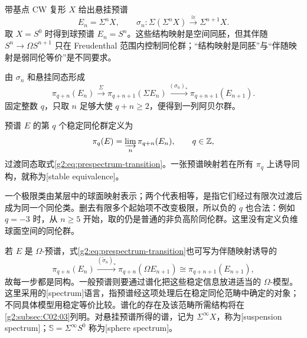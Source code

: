 \begin{example}\label{g2:exm:suspension-prespectrum}
	带基点 CW 复形 \(X\) 给出悬挂预谱
	\[
		E_n=\Sigma^nX,\qquad
		\sigma_n:\Sigma(\Sigma^nX)\xrightarrow{\cong}\Sigma^{n+1}X.
	\]
	取 \(X=S^0\) 时得到球预谱 \(E_n=S^n\)。这些结构映射是空间同胚，但其伴随 \(S^n\to\Omega S^{n+1}\) 只在 Freudenthal 范围内控制同伦群；“结构映射是同胚”与“伴随映射是弱同伦等价”是不同要求。
\end{example}

由 \(\sigma_n\) 和悬挂同态形成
\begin{equation}\label{g2:eq:prespectrum-transition}
	\pi_{q+n}(E_n)\xrightarrow{\ \Sigma\ }
	\pi_{q+n+1}(\Sigma E_n)
	\xrightarrow{(\sigma_n)_*}\pi_{q+n+1}(E_{n+1}).
\end{equation}
固定整数 \(q\)，只取 \(n\) 足够大使 \(q+n\ge2\)，便得到一列阿贝尔群。

\begin{definition}\label{g2:def:prespectrum-homotopy-groups}
	预谱 \(E\) 的第 \(q\) 个稳定同伦群定义为
	\[
		\pi_q(E)=\varinjlim_n\pi_{q+n}(E_n),\qquad q\in\mathbb Z,
	\]
	过渡同态取式\eqref{g2:eq:prespectrum-transition}。一张预谱映射若在所有 \(\pi_q\) 上诱导同构，就称为[stable equivalence]。
\end{definition}

一个极限类由某层中的球面映射表示；两个代表相等，是指它们经过有限次过渡后成为同一个同伦类。删去有限多个起始项不改变极限，所以负的 \(q\) 也合法：例如 \(q=-3\) 时，从 \(n\ge5\) 开始，取的仍是普通的非负高阶同伦群。这里没有定义负维球面空间的同伦群。

\ProseParagraphBreak

若 \(E\) 是 \(\Omega\)-预谱，式\eqref{g2:eq:prespectrum-transition}也可写为伴随映射诱导的
\[
	\pi_{q+n}(E_n)\xrightarrow{(\widetilde\sigma_n)_*}
	\pi_{q+n}(\Omega E_{n+1})\cong\pi_{q+n+1}(E_{n+1}),
\]
故每一步都是同构。一般预谱则要通过谱化把这些稳定信息放进适当的 \(\Omega\)-模型。这里采用的[spectrum]语言，指预谱经这项处理后在稳定同伦范畴中确定的对象；不同具体模型用稳定等价比较。谱化的存在及该范畴所需结构将在\cref{g2:subsec:C02:03}列明。对悬挂预谱所得的谱，记为 \(\Sigma^\infty X\)，称为[suspension spectrum]；\(\mathbb S=\Sigma^\infty S^0\) 称为[sphere spectrum]。

